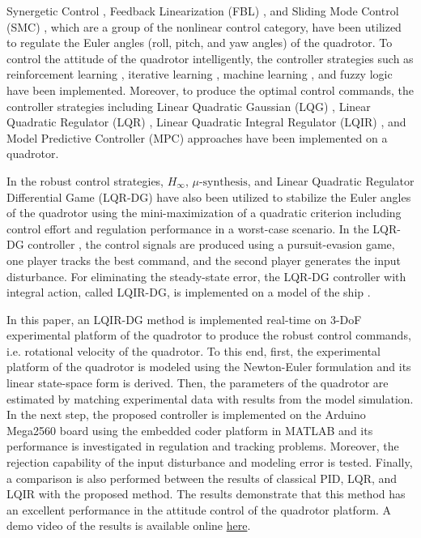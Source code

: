 \documentclass[peerreview]{IEEEtran}
\begin{document}
Synergetic Control \cite{article_Chara}, Feedback Linearization (FBL) \cite{article_Aboudonia}, and Sliding Mode Control (SMC) \cite{7007285}, which are a group of the nonlinear control category, have been utilized to regulate the Euler angles (roll, pitch, and yaw angles) of the quadrotor. To control the attitude of the quadrotor intelligently, the controller strategies such as reinforcement learning \cite{LIN2020135}, iterative learning \cite{electronics10202474}, machine learning \cite{4564736}, and fuzzy logic \cite{KIM20211888} have been implemented. Moreover, to produce the optimal control commands, the controller strategies including Linear Quadratic Gaussian (LQG) \cite{7367782}, Linear Quadratic Regulator (LQR) \cite{7064553_LQR}, Linear Quadratic Integral Regulator (LQIR) \cite{article_LQIR}, and Model Predictive Controller (MPC) approaches \cite{XUE20227992} have been implemented on a quadrotor.

In the robust control strategies, $H_{\infty}$, $\mu\text{-synthesis}$, and Linear Quadratic Regulator Differential Game (LQR-DG) \cite{10025263} have also been utilized to stabilize the Euler angles of the quadrotor using the mini-maximization of a quadratic criterion including control effort and regulation performance in a worst-case scenario. In the LQR-DG controller \cite{GLIZER201522}, the control signals are produced using a pursuit-evasion game, one player tracks the best command, and the second player generates the input disturbance. For eliminating the steady-state error, the LQR-DG controller with integral action, called LQIR-DG, is implemented on a model of the ship \cite{6957349}.

In this paper, an LQIR-DG method is implemented real-time on 3-DoF experimental platform of the quadrotor to produce the robust control commands, i.e. rotational velocity of the quadrotor.
To this end, first, the experimental platform of the quadrotor is modeled using the Newton-Euler formulation and its linear state-space form is derived.
Then, the parameters of the quadrotor are estimated by matching experimental data with results from the model simulation.
In the next step, the proposed controller is implemented on the Arduino Mega2560 board using the embedded coder platform in MATLAB and its performance is investigated in regulation and tracking problems.
Moreover, the rejection capability of the input disturbance and modeling error is tested.
Finally, a comparison is also performed between the results of classical PID, LQR, and LQIR with the proposed method. The results demonstrate that this method has an excellent performance in the attitude control of the quadrotor platform.
A demo video of the results is available online
\href{https://drive.google.com/drive/folders/1DIJs3wmIpmwI8slyHeitA6Ebe-khKTCt?usp=share_link}{here}.
\end{document}
